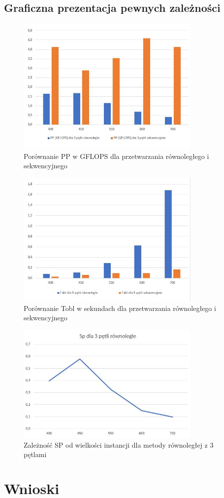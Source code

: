 \documentclass[10pt,a4paper]{article}
\begin{document}
\subsection*{Graficzna prezentacja pewnych zależności}
\begin{figure}[h]
	\centering
	\includegraphics[width=0.8\textwidth]{PP.JPG}
	\caption{Porównanie PP w GFLOPS dla przetwarzania równoległego i sekwencyjnego}
\end{figure}

\begin{figure}[h]
	\centering
	\includegraphics[width=0.8\textwidth]{Tobl.JPG}
	\caption{Porównanie Tobl w sekundach dla przetwarzania równoległego i sekwencyjnego}
\end{figure}

\begin{figure}[h]
	\centering
	\includegraphics[width=0.8\textwidth]{SP.JPG}
	\caption{Zależność SP od wielkości instancji dla metody równoległej z 3 pętlami}
\end{figure}

\section{Wnioski}
\end{document}
